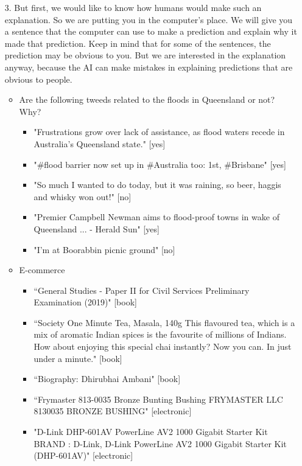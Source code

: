 \documentclass{article}
\theoremstyle{definition}
\theoremstyle{remark}
\begin{document}
\begin{enumerate}
    \item[3.] But first, we would like to know how humans would make such an explanation. So we are putting you in the computer's place. We will give you a sentence that the computer can use to make a prediction and explain why it made that prediction. Keep in mind that for some of the sentences, the prediction may be obvious to you. But we are interested in the explanation anyway, because the AI can make mistakes in explaining predictions that are obvious to people.
    \begin{itemize}
        \item Are the following tweeds related to the floods in Queensland or not? Why?
        \begin{itemize}
            \item "Frustrations grow over lack of assistance, as flood waters recede in Australia's Queensland state." [yes]
            \item "#flood barrier now set up in #Australia too: 1st, #Brisbane" [yes]
            \item "So much I wanted to do today, but it was raining, so beer, haggis and whisky won out!" [no]
            \item "Premier Campbell Newman aims to flood-proof towns in wake of Queensland ... - Herald Sun" [yes]
            \item "I'm at Boorabbin picnic ground" [no]
        \end{itemize}
        \item E-commerce \begin{itemize}
            \item ``General Studies - Paper II for Civil Services Preliminary Examination (2019)" [book]
            \item ``Society One Minute Tea, Masala, 140g This flavoured tea, which is a mix of aromatic Indian spices is the favourite of millions of Indians. How about enjoying this special chai instantly? Now you can. In just under a minute." [book]
            \item ``Biography: Dhirubhai Ambani" [book]
            \item ``Frymaster 813-0035 Bronze Bunting Bushing FRYMASTER LLC 8130035 BRONZE BUSHING" [electronic]
            \item "D-Link DHP-601AV PowerLine AV2 1000 Gigabit Starter Kit BRAND : D-Link, D-Link PowerLine AV2 1000 Gigabit Starter Kit (DHP-601AV)" [electronic]
        \end{itemize}

\end{itemize}
\end{enumerate}
\end{document}

